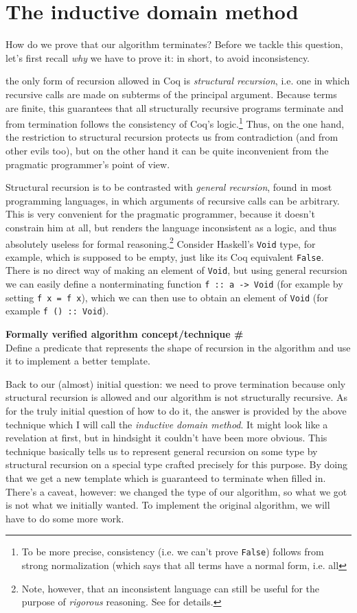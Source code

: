 \documentclass[declaration,mgr,english,shortabstract]{iithesis}
\newcommand{\m}[1]{\texttt{#1}}
\newcounter{cnt}
\newcommand{\runcnt}{\#\arabic{cnt}}
\newcommand{\concept}[1]
{
    \refstepcounter{cnt}
    \begin{center}
        \textbf{Formally verified algorithm concept/technique \runcnt} \\
        #1
    \end{center}
}
\begin{document}
\section{The inductive domain method} \label{inductivedomain}

How do we prove that our algorithm terminates? Before we tackle this question, let's first recall \textit{why} we have to prove it: in short, to avoid inconsistency. 





the only form of recursion allowed in Coq is \textit{structural recursion}, i.e. one in which recursive calls are made on subterms of the principal argument. Because terms are finite, this guarantees that all structurally recursive programs terminate and from termination follows the consistency of Coq's logic.\footnote{To be more precise, consistency (i.e. we can't prove \m{False}) follows from strong normalization (which says that all terms have a normal form, i.e. all } Thus, on the one hand, the restriction to structural recursion protects us from contradiction (and from other evils too), but on the other hand it can be quite inconvenient from the pragmatic programmer's point of view.

Structural recursion is to be contrasted with \textit{general recursion}, found in most programming languages, in which arguments of recursive calls can be arbitrary. This is very convenient for the pragmatic programmer, because it doesn't constrain him at all, but renders the language inconsistent as a logic, and thus absolutely useless for formal reasoning.\footnote{Note, however, that an inconsistent language can still be useful for the purpose of \textit{rigorous} reasoning. See \cite{FastAndLoose} for details.} Consider Haskell's \m{Void} type, for example, which is supposed to be empty, just like its Coq equivalent \m{False}. There is no direct way of making an element of \m{Void}, but using general recursion we can easily define a nonterminating function \m{f\ ::\ a -> Void} (for example by setting \m{f x = f x}), which we can then use to obtain an element of \m{Void} (for example \m{f ()\ ::\ Void}).

\concept{Define a predicate that represents the shape of recursion in the algorithm and use it to implement a better template.}

Back to our (almost) initial question: we need to prove termination because only structural recursion is allowed and our algorithm is not structurally recursive. As for the truly initial question of how to do it, the answer is provided by the above technique which I will call the \textit{inductive domain method}. It might look like a revelation at first, but in hindsight it couldn't have been more obvious. This technique basically tells us to represent general recursion on some type by structural recursion on a special type crafted precisely for this purpose. By doing that we get a new template which is guaranteed to terminate when filled in. There's a caveat, however: we changed the type of our algorithm, so what we got is not what we initially wanted. To implement the original algorithm, we will have to do some more work.
\end{document}
